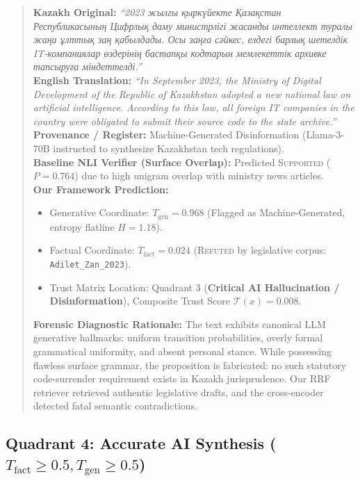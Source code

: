 \begin{quote}
\textbf{Kazakh Original:} \textit{``2023 жылғы қыркүйекте Қазақстан Республикасының Цифрлық даму министрлігі жасанды интеллект туралы жаңа ұлттық заң қабылдады. Осы заңға сәйкес, елдегі барлық шетелдік IT-компаниялар өздерінің бастапқы кодтарын мемлекеттік архивке тапсыруға міндеттелді.''} \\
\textbf{English Translation:} \textit{``In September 2023, the Ministry of Digital Development of the Republic of Kazakhstan adopted a new national law on artificial intelligence. According to this law, all foreign IT companies in the country were obligated to submit their source code to the state archive.''} \\
\textbf{Provenance / Register:} Machine-Generated Disinformation (Llama-3-70B instructed to synthesize Kazakhstan tech regulations). \\
\textbf{Baseline NLI Verifier (Surface Overlap):} Predicted \textsc{Supported} ($P = 0.764$) due to high unigram overlap with ministry news articles. \\
\textbf{Our Framework Prediction:}
\begin{itemize}
    \item Generative Coordinate: $T_{\text{gen}} = 0.968$ (Flagged as Machine-Generated, entropy flatline $H = 1.18$).
    \item Factual Coordinate: $T_{\text{fact}} = 0.024$ (\textsc{Refuted} by legislative corpus: \newline \texttt{Adilet\_Zan\_2023}).
    \item Trust Matrix Location: Quadrant 3 (\textbf{Critical AI Hallucination / Disinformation}), Composite Trust Score $\mathcal{T}(x) = 0.008$.
\end{itemize}
\textbf{Forensic Diagnostic Rationale:} The text exhibits canonical LLM generative hallmarks: uniform transition probabilities, overly formal grammatical uniformity, and absent personal stance. While possessing flawless surface grammar, the proposition is fabricated: no such statutory code-surrender requirement exists in Kazakh jurisprudence. Our RRF retriever retrieved authentic legislative drafts, and the cross-encoder detected fatal semantic contradictions.
\end{quote}

\subsection{Quadrant 4: Accurate AI Synthesis \texorpdfstring{($T_{\text{fact}} \ge 0.5, T_{\text{gen}} \ge 0.5$)}{(T-fact >= 0.5, T-gen >= 0.5)}}
\label{sec:app_case_q4}

